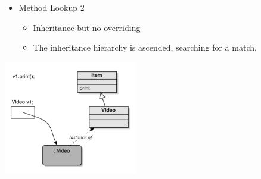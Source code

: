 \documentclass{beamer}
\begin{document}
\begin{frame}
\begin{itemize}
\item Method Lookup 2
\begin{itemize}
\item Inheritance but no overriding
\item The inheritance hierarchy is ascended, searching for a match.
\end{itemize}
\end{itemize}
\begin{center}
\includegraphics[height=5cm, keepaspectratio]{images/poly6}
\end{center}
\end{frame}
\end{document}

